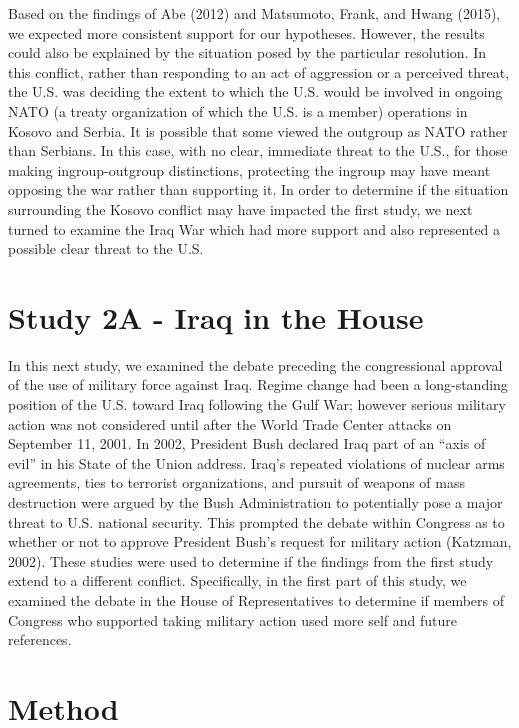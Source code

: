 \documentclass[english,,man]{apa6}
\begin{document}
Based on the findings of Abe (2012) and Matsumoto, Frank, and Hwang (2015), we expected more consistent support for our hypotheses. However, the results could also be explained by the situation posed by the particular resolution. In this conflict, rather than responding to an act of aggression or a perceived threat, the U.S. was deciding the extent to which the U.S. would be involved in ongoing NATO (a treaty organization of which the U.S. is a member) operations in Kosovo and Serbia. It is possible that some viewed the outgroup as NATO rather than Serbians. In this case, with no clear, immediate threat to the U.S., for those making ingroup-outgroup distinctions, protecting the ingroup may have meant opposing the war rather than supporting it. In order to determine if the situation surrounding the Kosovo conflict may have impacted the first study, we next turned to examine the Iraq War which had more support and also represented a possible clear threat to the U.S.

\hypertarget{study-2a---iraq-in-the-house}{%
\section{Study 2A - Iraq in the House}\label{study-2a---iraq-in-the-house}}

In this next study, we examined the debate preceding the congressional approval of the use of military force against Iraq. Regime change had been a long-standing position of the U.S. toward Iraq following the Gulf War; however serious military action was not considered until after the World Trade Center attacks on September 11, 2001. In 2002, President Bush declared Iraq part of an \enquote{axis of evil} in his State of the Union address. Iraq's repeated violations of nuclear arms agreements, ties to terrorist organizations, and pursuit of weapons of mass destruction were argued by the Bush Administration to potentially pose a major threat to U.S. national security. This prompted the debate within Congress as to whether or not to approve President Bush's request for military action (Katzman, 2002). These studies were used to determine if the findings from the first study extend to a different conflict. Specifically, in the first part of this study, we examined the debate in the House of Representatives to determine if members of Congress who supported taking military action used more self and future references.

\hypertarget{method-2}{%
\section{Method}\label{method-2}}
\end{document}
